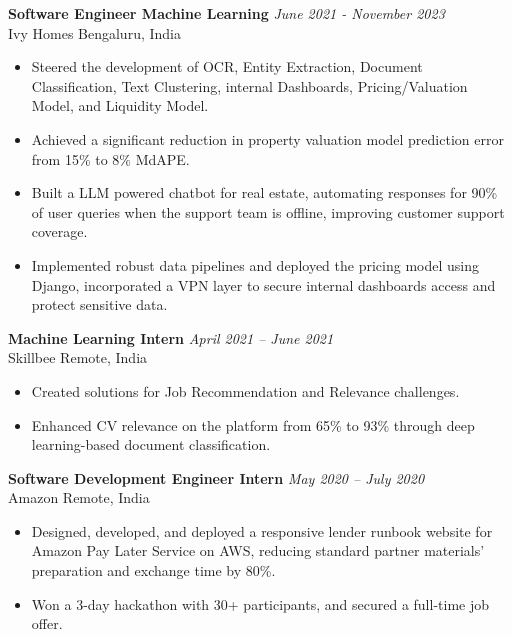 \documentclass[a4paper,20pt]{article}
\begin{document}
    \noindent\textbf{Software Engineer Machine Learning} \hfill \textit{June 2021 - November 2023}\\
    Ivy Homes \hfill Bengaluru, India
    \vspace{-2pt}
    \begin{itemize}[label=$\circ$]
        \item Steered the development of OCR, Entity Extraction, Document Classification, Text Clustering, internal Dashboards, Pricing/Valuation Model, and Liquidity Model.
        \vspace{-4pt}
        \item Achieved a significant reduction in property valuation model prediction error from 15\% to 8\% MdAPE.
        \vspace{-4pt}
        \item Built a LLM powered chatbot for real estate, automating responses for 90\% of user queries when the support team is offline, improving customer support coverage.
        \vspace{-4pt}
         \item Implemented robust data pipelines and deployed the pricing model using Django, incorporated a VPN layer to secure internal dashboards access and protect sensitive data.
      \end{itemize}

    \noindent\textbf{Machine Learning Intern} \hfill \textit{April 2021 – June 2021}\\
    Skillbee \hfill Remote, India
    \vspace{-2pt}
		\begin{itemize}[label=$\circ$]
         \item Created solutions for Job Recommendation and Relevance challenges.
         \vspace{-4pt}
         \item Enhanced CV relevance on the platform from 65\% to 93\% through deep learning-based document classification.
       \end{itemize}

    \noindent\textbf{Software Development Engineer Intern} \hfill \textit{May 2020 – July 2020}\\
    Amazon \hfill Remote, India
    \vspace{-2pt}
		\begin{itemize}[label=$\circ$]
        \item Designed, developed, and deployed a responsive lender runbook website for Amazon Pay Later Service on AWS, reducing standard partner materials’ preparation and exchange time by 80\%.
        \vspace{-4pt}
        \item Won a 3-day hackathon with 30+ participants, and secured a full-time job offer.
		\end{itemize}
\end{document}
